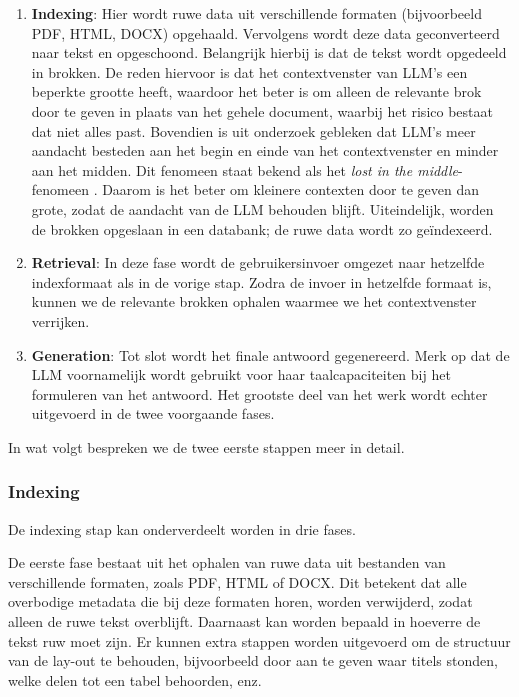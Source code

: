 \begin{enumerate} 
    \item \textbf{Indexing}: Hier wordt ruwe data uit verschillende formaten (bijvoorbeeld PDF, HTML, DOCX) opgehaald. Vervolgens wordt deze data geconverteerd naar tekst en opgeschoond. Belangrijk hierbij is dat de tekst wordt opgedeeld in brokken. De reden hiervoor is dat het contextvenster van LLM's een beperkte grootte heeft, waardoor het beter is om alleen de relevante brok door te geven in plaats van het gehele document, waarbij het risico bestaat dat niet alles past. Bovendien is uit onderzoek gebleken dat LLM's meer aandacht besteden aan het begin en einde van het contextvenster en minder aan het midden. Dit fenomeen staat bekend als het \textit{lost in the middle}-fenomeen \autocite{Databricks}. Daarom is het beter om kleinere contexten door te geven dan grote, zodat de aandacht van de LLM behouden blijft. Uiteindelijk, worden de brokken opgeslaan in een databank; de ruwe data wordt zo geïndexeerd. 
    \item \textbf{Retrieval}: In deze fase wordt de gebruikersinvoer omgezet naar hetzelfde indexformaat als in de vorige stap. Zodra de invoer in hetzelfde formaat is, kunnen we de relevante brokken ophalen waarmee we het contextvenster verrijken.   
    \item \textbf{Generation}: Tot slot wordt het finale antwoord gegenereerd. Merk op dat de \acrshort{LLM} voornamelijk wordt gebruikt voor haar taalcapaciteiten bij het formuleren van het antwoord. Het grootste deel van het werk wordt echter uitgevoerd in de twee voorgaande fases.
\end{enumerate}

In wat volgt bespreken we de twee eerste stappen meer in detail.

\subsubsection{Indexing}%
\label{subsubsec:indexing}

De indexing stap kan onderverdeelt worden in drie fases.

De eerste fase bestaat uit het ophalen van ruwe data uit bestanden van verschillende formaten, zoals PDF, HTML of DOCX. Dit betekent dat alle overbodige metadata die bij deze formaten horen, worden verwijderd, zodat alleen de ruwe tekst overblijft. Daarnaast kan worden bepaald in hoeverre de tekst ruw moet zijn. Er kunnen extra stappen worden uitgevoerd om de structuur van de lay-out te behouden, bijvoorbeeld door aan te geven waar titels stonden, welke delen tot een tabel behoorden, enz.

